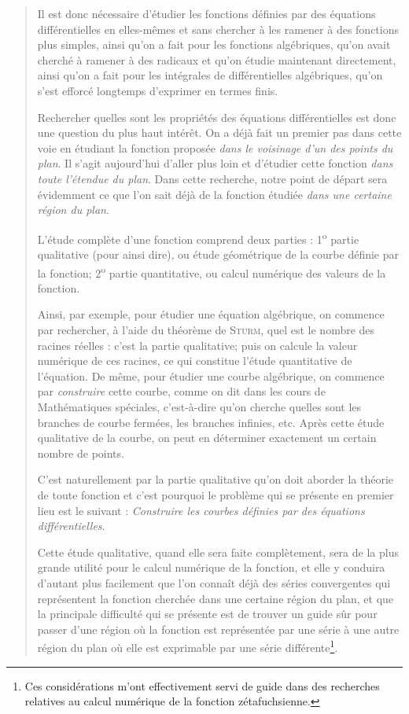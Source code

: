\documentclass[11pt]{article}
\begin{document}
\begin{quote}
\og Il est donc nécessaire d’étudier les fonctions définies par des équations différentielles en elles-mêmes et sans chercher à les ramener à des fonctions plus simples, ainsi qu’on a fait pour les fonctions algébriques, qu’on avait cherché à ramener à des radicaux et qu’on étudie maintenant directement, ainsi qu’on a fait pour les intégrales de différentielles algébriques, qu’on s’est efforcé longtemps d’exprimer en termes finis.

Rechercher quelles sont les propriétés des équations différentielles est donc une question du plus haut intérêt. On a déjà fait un premier pas dans cette voie en étudiant la fonction proposée \emph{dans le voisinage d’un des points du plan}. Il s’agit aujourd’hui d’aller plus loin et d’étudier cette fonction \emph{dans toute l’étendue du plan}. Dans cette recherche, notre point de départ sera évidemment ce que l’on sait déjà de la fonction étudiée \emph{dans une certaine région du plan}.

L’étude complète d’une fonction comprend deux parties : 1\textsuperscript{o} partie qualitative (pour ainsi dire), ou étude géométrique de la courbe définie par la fonction; 2\textsuperscript{o} partie quantitative, ou calcul numérique des valeurs de la fonction.

Ainsi, par exemple, pour étudier une équation algébrique, on commence par rechercher, à l’aide du théorème de \textsc{Sturm}, quel est le nombre des racines réelles : c’est la partie qualitative; puis on calcule la valeur numérique de ces racines, ce qui constitue l’étude quantitative de l’équation. De même, pour étudier une courbe algébrique, on commence par \emph{construire} cette courbe, comme on dit dans les cours de Mathématiques spéciales, c’est-à-dire qu’on cherche quelles sont les branches de courbe fermées, les branches infinies, etc. Après cette étude qualitative de la courbe, on peut en déterminer exactement un certain nombre de points.

C’est naturellement par la partie qualitative qu’on doit aborder la théorie de toute fonction et c’est pourquoi le problème qui se présente en premier lieu est le suivant : \emph{Construire les courbes définies par des équations différentielles}.

Cette étude qualitative, quand elle sera faite complètement, sera de la plus grande utilité pour le calcul numérique de la fonction, et elle y conduira d’autant plus facilement que l’on connaît déjà des séries convergentes qui représentent la fonction cherchée dans une certaine région du plan, et que la principale difficulté qui se présente est de trouver un guide sûr pour passer d’une région où la fonction est représentée par une série à une autre région du plan où elle est exprimable par une série différente\footnote[1]{Ces considérations m’ont effectivement servi de guide dans des recherches relatives au calcul numérique de la fonction zétafuchsienne.}.


\end{quote}
\end{document}
